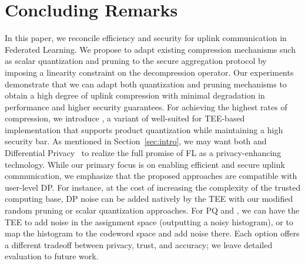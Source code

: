 \section{Concluding Remarks}
\label{sec:discussion}
In this paper, we reconcile efficiency and security for uplink communication in Federated Learning.
We propose to adapt existing compression mechanisms such as scalar quantization and pruning to the secure aggregation protocol by imposing a linearity constraint on the decompression operator.
Our experiments demonstrate that we can adapt both quantization and pruning mechanisms to obtain a high degree of uplink compression with minimal degradation in performance and higher security guarantees. For achieving the highest rates of compression, we introduce \SecInd, a variant of \SecAgg well-suited for TEE-based implementation that supports product quantization while maintaining a high security bar.
As mentioned in Section~\ref{sec:intro}, we {may want } both \SecAgg and Differential Privacy~\cite{abadi2016deep} to realize the full promise of FL as a privacy-enhancing technology.
While our primary focus is on enabling efficient and secure uplink communication, we emphasize that the proposed approaches are compatible with user-level DP.
For instance, {at the cost of increasing the complexity of the trusted computing base}, DP noise can be added natively by the TEE with our modified random pruning or scalar quantization approaches.
For PQ  and \SecInd, {we can have the TEE to add noise in the assignment space (\ie outputting a noisy histogram), or to map the histogram to the codeword space and add noise there.
Each option offers a different tradeoff between privacy, trust, and accuracy; we leave detailed evaluation to future work.}






